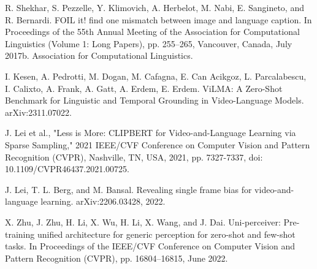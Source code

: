\begin{thebibliography}{}
    
R. Shekhar, S. Pezzelle, Y. Klimovich, A. Herbelot, M. Nabi, E. Sangineto, and R. Bernardi. FOIL it! find one mismatch between image and language caption. In Proceedings of the 55th Annual Meeting of the Association for Computational Linguistics (Volume 1: Long Papers), pp. 255–265, Vancouver, Canada, July 2017b. Association for Computational Linguistics.

I. Kesen, A. Pedrotti, M. Dogan, M. Cafagna, E. Can Acikgoz, L. Parcalabescu, I. Calixto, A. Frank, A. Gatt, A. Erdem, E. Erdem.
ViLMA: A Zero-Shot Benchmark for Linguistic and Temporal Grounding in Video-Language Models.
arXiv:2311.07022.

J. Lei et al., "Less is More: CLIPBERT for Video-and-Language Learning via Sparse Sampling," 2021 IEEE/CVF Conference on Computer Vision and Pattern Recognition (CVPR), Nashville, TN, USA, 2021, pp. 7327-7337, doi: 10.1109/CVPR46437.2021.00725.

J. Lei, T. L. Berg, and M. Bansal. Revealing single frame bias for video-and-language learning. arXiv:2206.03428, 2022.

X. Zhu, J. Zhu, H. Li, X. Wu, H. Li, X. Wang, and J. Dai. Uni-perceiver: Pre-training unified architecture for generic perception for zero-shot and few-shot tasks. In Proceedings of the IEEE/CVF Conference on Computer Vision and Pattern Recognition (CVPR), pp. 16804–16815, June 2022.


\end{thebibliography}

